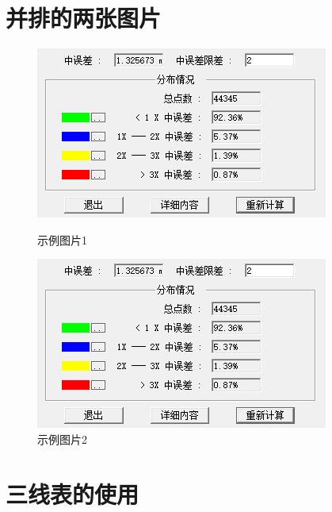 \section{并排的两张图片}

\begin{figure}[H]
        \setcounter{0}
	\subfigure%
	{
		\begin{minipage}[b]{.5\linewidth}%
			\centering
			\includegraphics[scale=0.5]{figure/DEM拼接精度.png}
            \caption{示例图片1}
            \label{示例图片1}
		\end{minipage}
	}  %
        \setcounter{0}
	\subfigure
	{
		\begin{minipage}[b]{.5\linewidth}
  \centering
	\includegraphics[scale=0.5]{figure/DEM拼接精度.png}
            \caption{示例图片2}
            \label{示例图片2}
		\end{minipage}
	}
 \end{figure}

\section{三线表的使用}

